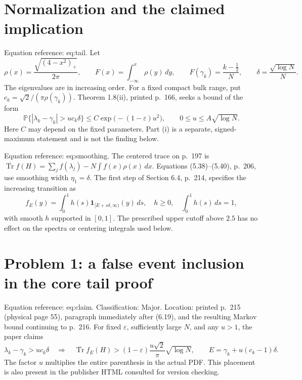 \documentclass[10pt]{article}
\begin{document}
\section*{Normalization and the claimed implication}
Equation reference: eq:tail. Let \[\rho(x)=\frac{\sqrt{(4-x^2)_+}}{2\pi},\qquad
 F(x)=\int_{-\infty}^x\rho(y)\,dy,\qquad
 F(\gamma_k)=\frac{k-\frac12}{N},\qquad
 \delta=\frac{\sqrt{\log N}}{N}.\] The eigenvalues are in increasing order. For a fixed compact bulk range, put \(c_k=\sqrt2/(\pi\rho(\gamma_k))\). Theorem 1.8(ii), printed p. 166, seeks a bound of the form \[\mathbb P\{|\lambda_k-\gamma_k|>u c_k\delta\}
 \leq C\exp\bigl(-(1-\varepsilon)u^2\bigr),
 \qquad 0\leq u\leq A\sqrt{\log N}.
 \] Here \(C\) may depend on the fixed parameters. Part (i) is a separate, signed-maximum statement and is not the finding below.\par
Equation reference: eq:smoothing. The centered trace on p. 197 is \(\overline{\operatorname{Tr}}f(H)=\sum_j f(\lambda_j)-N\int f(x)\rho(x)\,dx\). Equations (5.38)–(5.40), p. 206, use smoothing width \(\eta_1=\delta\). The first step of Section 6.4, p. 214, specifies the increasing transition as \[f_E(y)=\int_0^1 h(s)\mathbf1_{[E+s\delta,\infty)}(y)\,ds,
 \quad h\geq0,\quad \int_0^1h(s)\,ds=1,
 \] with smooth \(h\) supported in \([0,1]\). The prescribed upper cutoff above \(2.5\) has no effect on the spectra or centering integrals used below.\par
\section*{Problem 1: a false event inclusion in the core tail proof}
Equation reference: eq:claim. Classification: Major. Location: printed p. 215 (physical page 55), paragraph immediately after (6.19), and the resulting Markov bound continuing to p. 216. For fixed \(\varepsilon\), sufficiently large \(N\), and any \(u>1\), the paper claims \[\lambda_k-\gamma_k>u c_k\delta
 \quad\Longrightarrow\quad
 \overline{\operatorname{Tr}}f_E(H)>(1-\varepsilon)\frac{u\sqrt2}{\pi}\sqrt{\log N},
 \qquad E=\gamma_k+u(c_k-1)\delta.
 \] The factor \(u\) multiplies the entire parenthesis in the actual PDF. This placement is also present in the publisher HTML consulted for version checking.\par
\end{document}
